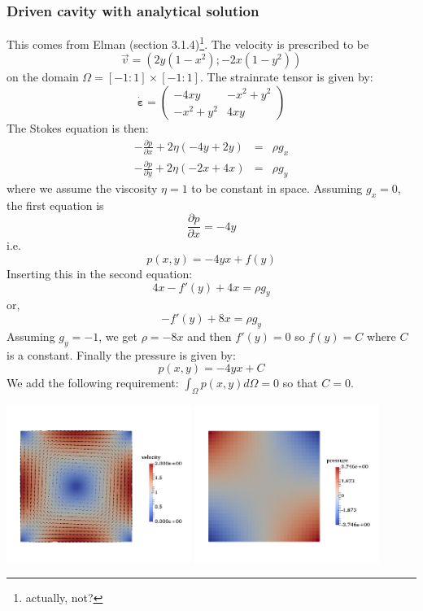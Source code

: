 \subsubsection{Driven cavity with analytical solution} \label{sec:ldc_anal}

This comes from Elman \etal \cite{elsw}(section 3.1.4)\footnote{actually, not?}. The velocity is prescribed to be
\[
{\vec v}=(2y(1-x^2) ; -2x(1-y^2) )
\]
on the domain $\Omega=[-1:1]\times[-1:1]$. The strainrate tensor is given by:
\[
\dot{\bm \varepsilon}=
\left(
\begin{array}{cc}
-4xy & -x^2+y^2  \\
-x^2+y^2 & 4xy   
\end{array}
\right)
\]
The Stokes equation is then:
\begin{eqnarray}
-\frac{\partial p}{\partial x} + 2\eta ( -4y + 2y ) &=& \rho g_x \\
-\frac{\partial p}{\partial y} + 2\eta ( -2x + 4x ) &=& \rho g_y
\end{eqnarray}
where we assume the viscosity $\eta=1$ to be constant in space.
Assuming $g_x=0$, the first equation is
\[
\frac{\partial p}{\partial x} = - 4 y
\]
i.e.
\[
p(x,y)= -4  y x +f(y)
\]
Inserting this in the second equation:
\[
4  x - f'(y) + 4 x  = \rho g_y
\]
or,
\[
-f'(y) + 8  x  = \rho g_y
\]
Assuming $g_y=-1$, we get $\rho=-8x$ and then $f'(y)=0$ so $f(y)=C$ where $C$
is a constant.
Finally the pressure is given by:
\[
p(x,y)=-4  y x + C
\]
We add the following requirement: $\int_\Omega p(x,y) d\Omega =0$ so that $C=0$.

\begin{center}
\includegraphics[width=6cm]{images/benchmark_ldc_anal/velo}
\includegraphics[width=6cm]{images/benchmark_ldc_anal/press}
\end{center}

